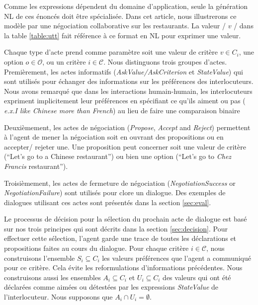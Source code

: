		Comme les expressions dépendent du domaine d'application, seule la génération NL de ces énoncés doit être spécialisée. Dans cet article, nous illustrerons ce modèle par une négociation collaborative sur les restaurants. La valeur / $ v $ / dans la table \ref {table:utt} fait référence à ce format  en NL pour exprimer une valeur.
		
		Chaque type d'acte prend comme paramètre soit une valeur de critère $v \in C_i$, une option $o \in \mathcal{O}$, ou un critère $i \in \mathcal{C}$. 
		Nous distinguons trois groupes d'actes. Premièrement, les actes informatifs (\textit{AskValue/AskCriterion} et \textit{StateValue}) qui sont utilisés pour échanger des informations sur les préférences des interlocuteurs.  Nous avons remarqué que dans les interactions humain-humain, les interlocuteurs expriment implicitement leur préférences en spécifiant ce qu'ils aiment ou pas ( \emph{e.x.}\textit{I like Chinese more than French}) au lieu de faire une comparaison binaire
		
		Deuxièmement, les actes de négociation (\textit{Propose}, \textit{Accept} and \textit{Reject}) permettent à l'agent de mener la négociation soit en ouvrant des propositions ou en accepter/ rejeter une. Une proposition peut concerner soit une valeur de critère (``Let's go to a Chinese restaurant'') ou bien une option (``Let's go to \emph{Chez Francis} restaurant'').
		
		Troisièmement, les actes de fermeture de négociation (\textit{NegotiationSuccess} or \textit{NegotiationFailure}) sont utilisés pour clore un dialogue. 
		Des exemples de dialogues utilisant ces actes sont présentés dans la section \ref{sec:eval}.
		
		Le processus de décision pour la sélection du prochain acte de dialogue est basé sur nos trois principes qui sont décrits dans la section \ref{sec:decision}. Pour effectuer cette sélection, l'agent garde une trace de toutes les déclarations et propositions faites au cours du dialogue. Pour chaque critère $ i \in \mathcal{C} $, nous construisons l'ensemble $ S_i \subseteq C_i $  les valeurs préférences que l'agent a communiqué pour ce critère. Cela évite les reformulations d'informations précédentes. Nous construisons aussi les ensembles $ A_i \subseteq C_i $ et $ U_i \subseteq C_i $ des valeurs qui ont été déclarées comme aimées ou détestées par les expressions \emph {StateValue} de l'interlocuteur. Nous supposons que $ A_i \cap U_i = \emptyset $.
		
